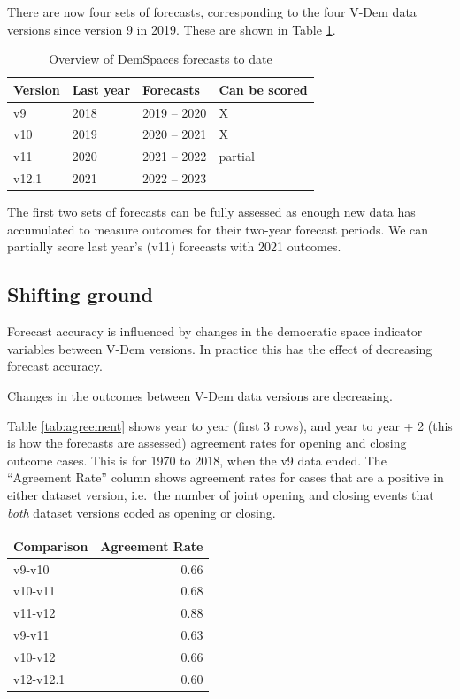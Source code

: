 \documentclass[
  11pt,
]{article}
\begin{document}
There are now four sets of forecasts, corresponding to the four V-Dem
data versions since version 9 in 2019. These are shown in Table
\ref{tab:overview}.

\begin{table}

\caption{\label{tab:overview}Overview of DemSpaces forecasts to date}
\centering
\begin{tabular}[t]{llll}
\toprule
Version & Last year & Forecasts & Can be scored\\
\midrule
v9 & 2018 & 2019 – 2020 & X\\
v10 & 2019 & 2020 – 2021 & X\\
v11 & 2020 & 2021 – 2022 & partial\\
v12.1 & 2021 & 2022 – 2023 & \\
\bottomrule
\end{tabular}
\end{table}

The first two sets of forecasts can be fully assessed as enough new data
has accumulated to measure outcomes for their two-year forecast periods.
We can partially score last year's (v11) forecasts with 2021 outcomes.

\hypertarget{shifting-ground}{%
\subsection{Shifting ground}\label{shifting-ground}}

Forecast accuracy is influenced by changes in the democratic space
indicator variables between V-Dem versions. In practice this has the
effect of decreasing forecast accuracy.

Changes in the outcomes between V-Dem data versions are decreasing.

Table \ref{tab:agreement} shows year to year (first 3 rows), and year to
year + 2 (this is how the forecasts are assessed) agreement rates for
opening and closing outcome cases. This is for 1970 to 2018, when the v9
data ended. The ``Agreement Rate'' column shows agreement rates for
cases that are a positive in either dataset version, i.e.~the number of
joint opening and closing events that \emph{both} dataset versions coded
as opening or closing.

\begin{table}
\centering
\begin{tabular}{lr}
\toprule
Comparison & Agreement Rate\\
\midrule
v9-v10 & 0.66\\
v10-v11 & 0.68\\
v11-v12 & 0.88\\
\addlinespace
v9-v11 & 0.63\\
v10-v12 & 0.66\\
\addlinespace
v12-v12.1 & 0.60\\
\bottomrule
\end{tabular}
\end{table}
\end{document}
